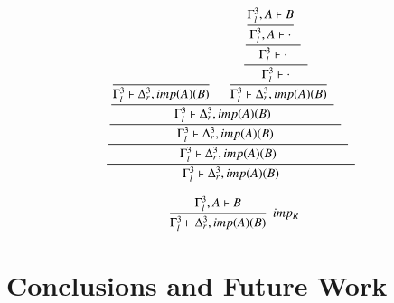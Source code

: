 \documentclass[a4paper,10pt]{article}
\begin{document}
{\scriptsize\[\cfrac{\cfrac{\cfrac{\cfrac{\cfrac{}
{\Gamma_{l}^{3}  \vdash \Delta_{r}^{3}, imp (A) (B)  } \;\; 
\quad
\cfrac{\cfrac{\cfrac{\cfrac{\Gamma_{l}^{3}, A  \vdash B }
{\Gamma_{l}^{3}, A  \vdash  \cdot } \;\; }
{\Gamma_{l}^{3}  \vdash  \cdot } \;\; }
{\Gamma_{l}^{3}  \vdash  \cdot } \;\; }
{\Gamma_{l}^{3}  \vdash \Delta_{r}^{3}, imp (A) (B)  } \;\; }
{\Gamma_{l}^{3}  \vdash \Delta_{r}^{3}, imp (A) (B)  } \;\; }
{\Gamma_{l}^{3}  \vdash \Delta_{r}^{3}, imp (A) (B)  } \;\; }
{\Gamma_{l}^{3}  \vdash \Delta_{r}^{3}, imp (A) (B)  } \;\; }
{\Gamma_{l}^{3}  \vdash \Delta_{r}^{3}, imp (A) (B)  } \;\; \]}

{\scriptsize\[\cfrac{\Gamma_{l}^{3}, A  \vdash B }
{\Gamma_{l}^{3}  \vdash \Delta_{r}^{3}, imp (A) (B)  } \;\; imp_{R}\]}


\section{Conclusions and Future Work}



\end{document}
